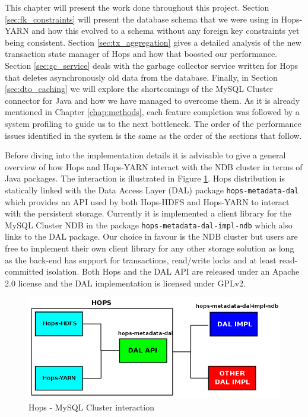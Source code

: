 This chapter will present the work done throughout this
project. Section \ref{sec:fk_constraints} will present the
database schema that we were using in Hops-YARN and how this evolved
to a schema without any foreign key constraints yet being
consistent. Section \ref{sec:tx_aggregation} gives a detailed analysis
of the new transaction state manager of Hops and how that boosted our
performance. Section \ref{sec:gc_service} deals with the garbage
collector service written for Hops that deletes asynchronously old
data from the database. Finally, in Section \ref{sec:dto_caching} we
will explore the shortcomings of the MySQL Cluster connector for Java and
how we have managed to overcome them. As it is already mentioned in Chapter
\ref{chap:methods}, each feature completion was followed by a system
profiling to guide us to the next bottleneck. The order of the
performance issues identified in the system is the same as the order
of the sections that follow.

Before diving into the implementation details it is advisable to give a
general overview of how Hops and Hops-YARN interact with the NDB
cluster in terms of Java packages. The interaction is illustrated in
Figure \ref{fig:impl_hops_ndb}. Hops distribution is statically linked
with the Data Access Layer (DAL) package \texttt{hops-metadata-dal}
which provides an API used by both Hops-HDFS and Hops-YARN to interact
with the persistent storage. Currently it is implemented a client
library for the MySQL Cluster NDB in the package
\texttt{hops-metadata-dal-impl-ndb} which also links to the DAL
package. Our choice in favour is the NDB cluster but users are free to
implement their own client library for any other storage solution as
long as the back-end has support for transactions, read/write locks and
at least read-committed isolation. Both Hops and the DAL API are
released under an Apache 2.0 license and the DAL implementation is
licensed under GPLv2.

\begin{figure}
\centering
\includegraphics[scale=0.5]{resources/images/Implementation/hops_ndb_interaction.png}
\caption{Hops - MySQL Cluster interaction}
\label{fig:impl_hops_ndb}
\end{figure}
